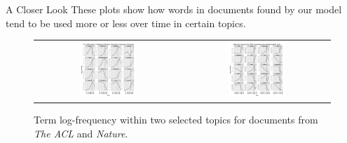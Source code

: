 \documentclass[final,t]{beamer}
\begin{document}
\begin{frame}{}
\begin{columns}[t]
\begin{column}{.34\linewidth}
\begin{block}{A Closer Look}
These plots show how words in documents found by our model tend to be
used more or less over time in certain topics.
\label{block:example_documents}
      \begin{figure}
      \begin{tabular}{cc}
      \includegraphics[width=0.4\textwidth]{../figures/acl_brown.pdf} &
      \includegraphics[width=0.4\textwidth]{../figures/nature_cloning.pdf} \\
     \end{tabular}
      \caption{Term log-frequency within two selected topics for
        documents from \emph{The ACL} and \emph{Nature}.}
   \end{figure}
       




\end{block}
\end{column}
\end{columns}
\end{frame}
\end{document}
